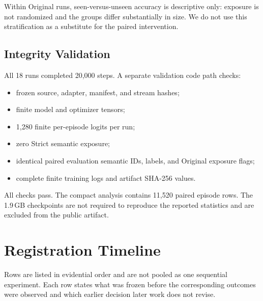 Within Original runs, seen-versus-unseen accuracy is descriptive only:
exposure is not randomized and the groups differ substantially in size.  We do not
use this stratification as a substitute for the paired intervention.

\subsection{Integrity Validation}

All 18 runs completed 20,000 steps.  A separate validation code path checks:
\begin{itemize}
    \item frozen source, adapter, manifest, and stream hashes;
    \item finite model and optimizer tensors;
    \item 1,280 finite per-episode logits per run;
    \item zero Strict semantic exposure;
    \item identical paired evaluation semantic IDs, labels, and Original
    exposure flags;
    \item complete finite training logs and artifact SHA-256 values.
\end{itemize}
All checks pass.  The compact analysis contains 11,520 paired episode rows.
The 1.9\,GB checkpoints are not required to reproduce the reported statistics
and are excluded from the public artifact.

\section{Registration Timeline}
\label{app:registration-timeline}

Rows are listed in evidential order and are not pooled as one sequential
experiment.  Each row states what was frozen before the corresponding
outcomes were observed and which earlier decision later work does not revise.

